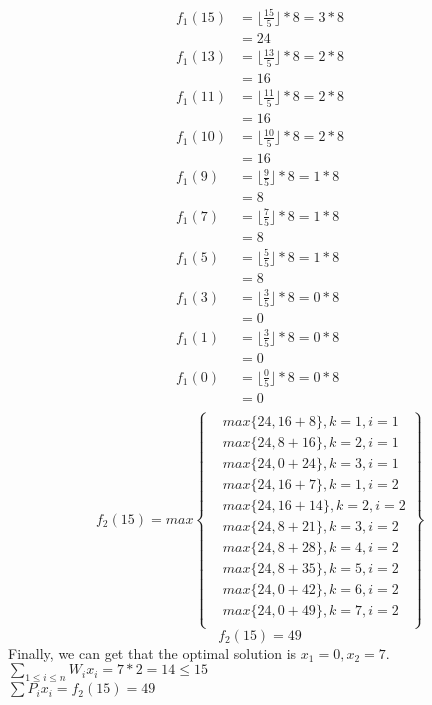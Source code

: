 \documentclass{article}
\begin{document}
	\begin{align*}
f_{1}(15) &= \lfloor \frac{15}{5} \rfloor * 8 = 3 * 8\\
&= 24\\
f_{1}(13) &= \lfloor \frac{13}{5} \rfloor * 8 = 2 * 8\\
&= 16\\
f_{1}(11) &= \lfloor \frac{11}{5} \rfloor * 8 = 2 * 8\\
&= 16\\
f_{1}(10) &= \lfloor \frac{10}{5} \rfloor * 8 = 2 * 8\\
&= 16\\
f_{1}(9) &= \lfloor \frac{9}{5} \rfloor * 8 = 1 * 8\\
&= 8\\
f_{1}(7) &= \lfloor \frac{7}{5} \rfloor * 8 = 1 * 8\\
&= 8\\
f_{1}(5) &= \lfloor \frac{5}{5} \rfloor * 8 = 1 * 8\\
&= 8\\
f_{1}(3) &= \lfloor \frac{3}{5} \rfloor * 8 = 0 * 8\\
&= 0\\
f_{1}(1) &= \lfloor \frac{3}{5} \rfloor * 8 = 0 * 8\\
&= 0\\
f_{1}(0) &= \lfloor \frac{0}{5} \rfloor * 8 = 0 * 8\\
&= 0\\
\end{align*}
$$ f_{2}(15) = max \left\{
\begin{aligned}
 & max\{24, 16 + 8 \}, k = 1, i = 1\\
 & max\{24, 8 + 16\}, k = 2, i = 1\\
& max\{24, 0 + 24\}, k = 3, i = 1\\
& max\{24, 16 + 7  \}, k = 1, i = 2\\
 & max\{24, 16 + 14 \}, k = 2, i = 2\\
& max\{24, 8 + 21\}, k = 3, i = 2\\
 & max\{24, 8 + 28 \}, k = 4, i = 2\\
 & max\{24, 8+ 35 \}, k = 5, i = 2\\
 & max\{24, 0 + 42\}, k = 6, i = 2\\
 & max\{24, 0 + 49\}, k = 7, i = 2\\
\end{aligned}
\right\}
$$
$$
f_{2}(15) = 49
$$
Finally, we can get that the optimal solution is $x_1 = 0, x_2 = 7$.\\
$\sum_{1\leq i \leq n} W_{i}x_i	= 7 * 2 = 14 \leq 15$\\
$\sum P_{i}x_i = f_{2}(15) = 49$
\end{document}
